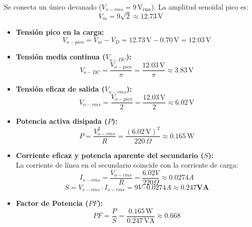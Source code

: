 Se conecta un único devanado ($V_{s-rms} = 9\,\mathrm{V_{rms}}$). La amplitud senoidal pico es:
\begin{equation}
    V_m = 9\sqrt{2} \approx 12.73\,\mathrm{V}
\end{equation}
\begin{itemize}
    \item \textbf{Tensión pico en la carga:}
    \begin{equation}
        V_{o-pico} = V_m - V_D = 12.73\,\mathrm{V} - 0.70\,\mathrm{V} = \mathbf{12.03\,\mathrm{V}}
    \end{equation}
    \item \textbf{Tensión media continua ($V_{o-DC}$):}
    \begin{equation}
        V_{o-DC} = \frac{V_{o-pico}}{\pi} = \frac{12.03\,\mathrm{V}}{\pi} \approx \mathbf{3.83\,\mathrm{V}}
    \end{equation}
    \item \textbf{Tensión eficaz de salida ($V_{o-rms}$):}
    \begin{equation}
        V_{o-rms} = \frac{V_{o-pico}}{2} = \frac{12.03\,\mathrm{V}}{2} \approx \mathbf{6.02\,\mathrm{V}}
    \end{equation}
    \item \textbf{Potencia activa disipada ($P$):}
    \begin{equation}
        P = \frac{V_{o-rms}^2}{R} = \frac{(6.02\,\mathrm{V})^2}{220\,\Omega} \approx \mathbf{0.165\,\mathrm{W}}
    \end{equation}
    \item \textbf{Corriente eficaz y potencia aparente del secundario ($S$):}\\
    La corriente de línea en el secundario coincide con la corriente de carga:
    \begin{equation}
        I_{s-rms}= \frac{V_{o-rms}}{R} = \frac{6.02V} {220\Omega} \approx 0.0274A 
    \end{equation}
    \begin{equation}
    S = V_{s-rms} \cdot I_{s-rms} = 9V \cdot 0.0274A \approx \mathbf{0.247 VA}
    \end{equation}
    
    \item \textbf{Factor de Potencia ($PF$):}
    \begin{equation}
        PF = \frac{P}{S} = \frac{0.165\,\mathrm{W}}{0.247\,\mathrm{VA}} \approx \mathbf{0.668}
    \end{equation}
\end{itemize}

